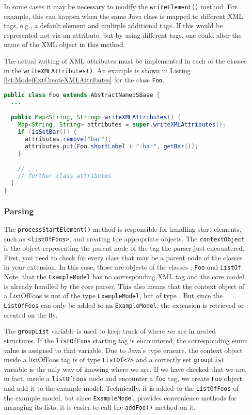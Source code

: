 In some cases it may be necessary to modify the \texttt{writeElement()} method.
For example, this can happen when the same Java class is mapped to different XML tags, e.g., a default element and multiple additional tags.
If this would be represented not via an attribute, but by using different tags, one could alter the name of the XML object in this method.

The actual writing of XML attributes must be implemented in each of the classes in the \texttt{writeXMLAttributes()}.
An example is shown in Listing \ref{lst:ModelExtCreateXMLAttributes} for the class \texttt{Foo}.

\begin{lstlisting}[language=Java,caption={Method to write the XML attributes},label={lst:ModelExtCreateXMLAttributes}]
public class Foo extends AbstractNamedSBase {
  ...

  public Map<String, String> writeXMLAttributes() {
    Map<String, String> attributes = super.writeXMLAttributes();
    if (isSetBar()) {
      attributes.remove("bar");
      attributes.put(Foo.shortLabel + ":bar", getBar());
    }

    // ...
    // further class attributes
  }
}
\end{lstlisting}


\subsubsection{Parsing}

The \texttt{processStartElement()} method is responsible for handling start elements, such as \texttt{<listOfFoos>}, and creating the appropriate objects.
The \texttt{contextObject} is the object representing the parent node of the tag the parser just encountered.
First, you need to check for every class that may be a parent node of the classes in your extension.
In this case, those are objects of the classes \Model, \texttt{Foo} and \texttt{ListOf}.
Note, that the \texttt{ExampleModel} has no corresponding XML tag and the core model is already handled by the core parser.
This also means that the context object of a ListOfFoos is not of the type \texttt{ExampleModel}, but of type \Model.
But since the \texttt{ListOfFoos} can only be added to an \texttt{ExampleModel}, the extension is retrieved or created on the fly.

The \texttt{groupList} variable is used to keep track of where we are in nested structures.
If the \texttt{listOfFoos} starting tag is encountered, the corresponding enum value is assigned to that variable.
Due to Java's type erasure, the context object inside a listOfFoos tag is of type \texttt{ListOf<?>} and a correctly set \texttt{groupList} variable is the only way of knowing where we are.
If we have checked that we are, in fact, inside a \texttt{listOfFoos} node and encounter a \texttt{foo} tag, we create \texttt{Foo} object and add it to the example model.
Technically, it is added to the \texttt{ListOfFoos} of the example model, but since \texttt{ExampleModel} provides convenience methods for managing its lists, it is easier to call the \texttt{addFoo()} method on it.

